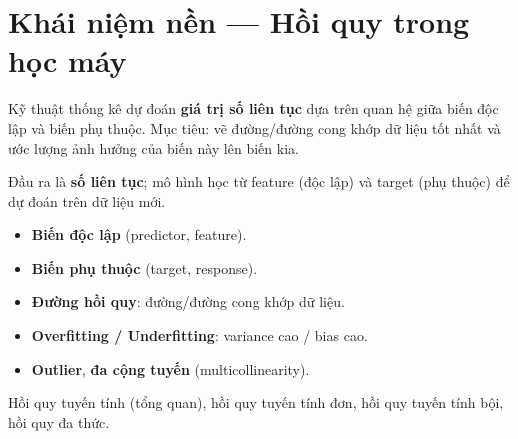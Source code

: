 \section{Khái niệm nền --- Hồi quy trong học máy}
\label{sec:khai-niem-hoi-quy}

\begin{dinhnghia}[title={Phân tích hồi quy (Regression Analysis)}]
Kỹ thuật thống kê dự đoán \textbf{giá trị số liên tục} dựa trên quan hệ giữa biến độc lập và biến phụ thuộc.
Mục tiêu: vẽ đường/đường cong khớp dữ liệu tốt nhất và ước lượng ảnh hưởng của biến này lên biến kia.
\end{dinhnghia}

\begin{ynghia}[title={Học có giám sát --- hồi quy}]
Đầu ra là \textbf{số liên tục}; mô hình học từ feature (độc lập) và target (phụ thuộc) để dự đoán trên dữ liệu mới.
\end{ynghia}

\begin{phuongphap}[title={Thuật ngữ thường gặp}]
\begin{itemize}
  \item \textbf{Biến độc lập} (predictor, feature).
  \item \textbf{Biến phụ thuộc} (target, response).
  \item \textbf{Đường hồi quy}: đường/đường cong khớp dữ liệu.
  \item \textbf{Overfitting / Underfitting}: variance cao / bias cao.
  \item \textbf{Outlier}, \textbf{đa cộng tuyến} (multicollinearity).
\end{itemize}
\end{phuongphap}

\begin{phuongphap}[title={Các chương trong phần này}]
Hồi quy tuyến tính (tổng quan), hồi quy tuyến tính đơn, hồi quy tuyến tính bội, hồi quy đa thức.
\end{phuongphap}

